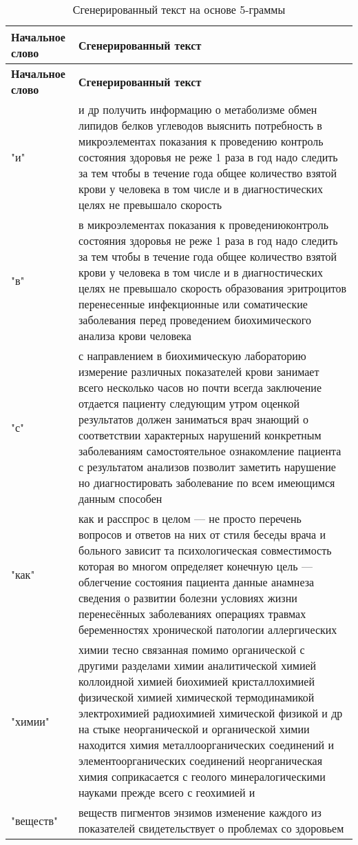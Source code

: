 \begin{longtable}{|p{4cm}|p{12cm}|}
    \caption{Сгенерированный текст на основе 5-граммы}
    \hline
    \textbf{Начальное слово} & \textbf{Сгенерированный текст} \\ \hline
    \endfirsthead
    \hline
    \textbf{Начальное слово} & \textbf{Сгенерированный текст} \\ \hline
    \endhead
    "и" &   и др получить информацию о метаболизме обмен липидов белков углеводов выяснить потребность в микроэлементах показания к проведению контроль состояния здоровья не реже 1 раза в год надо следить за тем чтобы в течение года общее количество взятой крови у человека в том числе и в диагностических целях не превышало скорость    \\ \hline
    "в" &  в микроэлементах показания к проведениюконтроль состояния здоровья не реже 1 раза в год надо следить за тем чтобы в течение года общее количество взятой крови у человека в том числе и в диагностических целях не превышало скорость образования эритроцитов перенесенные инфекционные или соматические заболевания перед проведением биохимического анализа крови человека    \\ \hline
    "с" &   с направлением в биохимическую лабораторию измерение различных показателей крови занимает всего несколько часов но почти всегда заключение отдается пациенту следующим утром оценкой результатов должен заниматься врач знающий о соответствии характерных нарушений конкретным заболеваниям самостоятельное ознакомление пациента с результатом анализов позволит заметить нарушение но диагностировать заболевание по всем имеющимся данным способен    \\ \hline
    "как" &   как и расспрос в целом — не просто перечень вопросов и ответов на них от стиля беседы врача и больного зависит та психологическая совместимость которая во многом определяет конечную цель — облегчение состояния пациента данные анамнеза сведения о развитии болезни условиях жизни перенесённых заболеваниях операциях травмах беременностях хронической патологии аллергических    \\ \hline
    "химии" &   химии тесно связанная помимо органической с другими разделами химии аналитической химией коллоидной химией биохимией кристаллохимией физической химией химической термодинамикой электрохимией радиохимией химической физикой и др на стыке неорганической и органической химии находится химия металлоорганических соединений и элементоорганических соединений неорганическая химия соприкасается с геолого минералогическими науками прежде всего с геохимией и    \\ \hline
    "веществ" &  веществ пигментов энзимов изменение каждого из показателей свидетельствует о проблемах со здоровьем    \\ \hline
\end{longtable}

